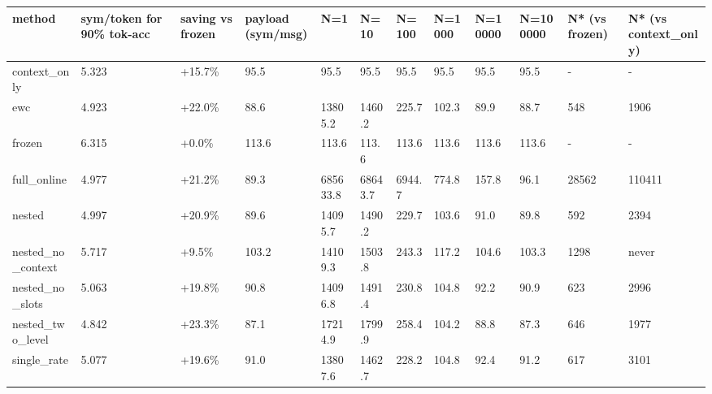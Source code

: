 \begin{tabular}{llllllllllll}
\hline
method & sym/token for 90\% tok-acc & saving vs frozen & payload (sym/msg) & N=1 & N=10 & N=100 & N=1000 & N=10000 & N=100000 & N* (vs frozen) & N* (vs context\_only) \\
\hline
context\_only & 5.323 & +15.7\% & 95.5 & 95.5 & 95.5 & 95.5 & 95.5 & 95.5 & 95.5 & - & - \\
ewc & 4.923 & +22.0\% & 88.6 & 13805.2 & 1460.2 & 225.7 & 102.3 & 89.9 & 88.7 & 548 & 1906 \\
frozen & 6.315 & +0.0\% & 113.6 & 113.6 & 113.6 & 113.6 & 113.6 & 113.6 & 113.6 & - & - \\
full\_online & 4.977 & +21.2\% & 89.3 & 685633.8 & 68643.7 & 6944.7 & 774.8 & 157.8 & 96.1 & 28562 & 110411 \\
nested & 4.997 & +20.9\% & 89.6 & 14095.7 & 1490.2 & 229.7 & 103.6 & 91.0 & 89.8 & 592 & 2394 \\
nested\_no\_context & 5.717 & +9.5\% & 103.2 & 14109.3 & 1503.8 & 243.3 & 117.2 & 104.6 & 103.3 & 1298 & never \\
nested\_no\_slots & 5.063 & +19.8\% & 90.8 & 14096.8 & 1491.4 & 230.8 & 104.8 & 92.2 & 90.9 & 623 & 2996 \\
nested\_two\_level & 4.842 & +23.3\% & 87.1 & 17214.9 & 1799.9 & 258.4 & 104.2 & 88.8 & 87.3 & 646 & 1977 \\
single\_rate & 5.077 & +19.6\% & 91.0 & 13807.6 & 1462.7 & 228.2 & 104.8 & 92.4 & 91.2 & 617 & 3101 \\
\hline
\end{tabular}
